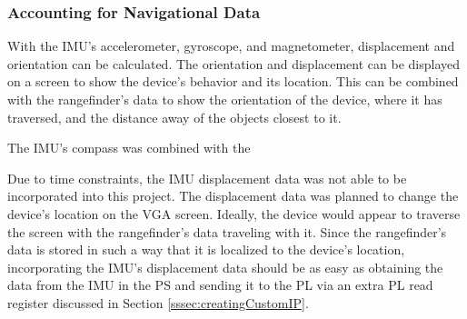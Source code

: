 \subsubsection{Accounting for Navigational Data}
With the IMU's accelerometer, gyroscope, and magnetometer, displacement and orientation can be calculated. The orientation and displacement can be displayed on a screen to show the device's behavior and its location. This can be combined with the rangefinder's data to show the orientation of the device, where it has traversed, and the distance away of the objects closest to it.
\par
The IMU's compass was combined with the 



\par
Due to time constraints, the IMU displacement data was not able to be incorporated into this project. The displacement data was planned to change the device's location on the VGA screen. Ideally, the device would appear to traverse the screen with the rangefinder's data traveling with it. Since the rangefinder's data is stored in such a way that it is localized to the device's location, incorporating the IMU's displacement data should be as easy as obtaining the data from the IMU in the PS and sending it to the PL via an extra PL read register discussed in Section \ref{sssec:creatingCustomIP}.



